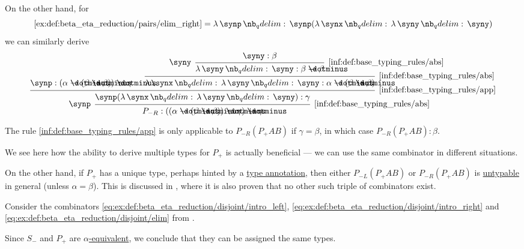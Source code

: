 \begin{example}
\begin{thmenum}
    On the other hand, for
    \begin{equation*}
      \ref{ex:def:beta_eta_reduction/pairs/elim_right} = \qabs \synp \synp (\qabs \synx \qabs \syny \syny)
    \end{equation*}
    we can similarly derive
    \begin{equation*}
      \begin{prooftree}
        \hypo{ \synp: (\alpha \synimplies (\beta \synimplies \beta)) \synimplies \gamma }

        \hypo{ \syny: \beta }
        \infer[left label=\( \syny \)]1[\ref{inf:def:base_typing_rules/abs}]{ \qabs \syny \syny: \beta \synimplies \beta }
        \infer1[\ref{inf:def:base_typing_rules/abs}]{ \qabs \synx \qabs \syny \syny: \alpha \synimplies (\beta \synimplies \beta) }

        \infer2[\ref{inf:def:base_typing_rules/app}]{ \synp (\qabs \synx \qabs \syny \syny): \gamma }
        \infer[left label=\( \synp \)]1[\ref{inf:def:base_typing_rules/abs}]{ P_{-R}: ((\alpha \synimplies (\beta \synimplies \beta)) \synimplies \gamma) \synimplies \gamma }
      \end{prooftree}
    \end{equation*}

    The rule \ref{inf:def:base_typing_rules/app} is only applicable to \( P_{-R} (P_+ A B) \) if \( \gamma = \beta \), in which case \( P_{-R} (P_+ A B): \beta \).

    We see here how the ability to derive multiple types for \( P_+ \) is actually beneficial --- we can use the same combinator in different situations.

    On the other hand, if \( P_+ \) has a unique type, perhaps hinted by a \hyperref[con:type_annotation]{type annotation}, then either \( P_{-L} (P_+ A B) \) or \( P_{-R} (P_+ A B) \) is \hyperref[def:typability]{untypable} in general (unless \( \alpha = \beta \)). This is discussed in \cite{MathOF:product_type_in_simply_typed_lambda_terms}, where it is also proven that no other such triple of combinators exist.

     Consider the combinators \ref{eq:ex:def:beta_eta_reduction/disjoint/intro_left}, \ref{eq:ex:def:beta_eta_reduction/disjoint/intro_right} and \ref{eq:ex:def:beta_eta_reduction/disjoint/elim} from .

    Since \( S_- \) and \( P_+ \) are \hyperref[def:lambda_term_alpha_equivalence]{\( \alpha \)-equivalent}, we conclude that they can be assigned the same types.


\end{thmenum}
\end{example}
